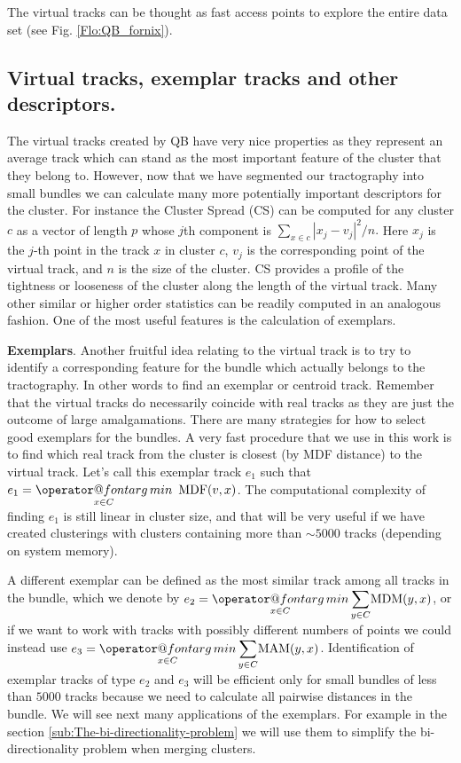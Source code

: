 \documentclass[preprint,authoryear,a4paper,10pt,onecolumn]{elsarticle}
\makeatletter
\def\argmin{\mathop{\operator@font arg\,min}}
\makeatother
\begin{document}
The virtual tracks can be thought as fast access points to explore the
entire data set (see Fig. \ref{Flo:QB_fornix}).


\subsection{Virtual tracks, exemplar tracks and other descriptors.}

The virtual tracks created by QB have very nice properties as they
represent an average track which can stand as the most important feature
of the cluster that they belong to. However, now that we have segmented
our tractography into small bundles we can calculate many more
potentially important descriptors for the cluster. For instance the
Cluster Spread (CS) can be computed for any cluster $c$ as a vector of
length $p$ whose $j$th component is $\sum_{x\in c}|x_{j}-v_{j}|^{2}/n.$
Here $x_{j}$ is the $j$-th point in the track $x$ in cluster $c$,
$v_{j}$ is the corresponding point of the virtual track, and $n$ is the
size of the cluster. CS provides a profile of the tightness or looseness
of the cluster along the length of the virtual track. Many other similar
or higher order statistics can be readily computed in an analogous
fashion. One of the most useful features is the calculation of
exemplars.

\textbf{Exemplars}. Another fruitful idea relating to the virtual track
is to try to identify a corresponding feature for the bundle which
actually belongs to the tractography. In other words to find an exemplar
or centroid track. Remember that the virtual tracks do necessarily
coincide with real tracks as they are just the outcome of large
amalgamations. There are many strategies for how to select good
exemplars for the bundles. A very fast procedure that we use in this
work is to find which real track from the cluster is closest (by MDF
distance) to the virtual track. Let's call this exemplar track $e_{1}$
such that $e_{1}={\displaystyle \argmin_{x\in C}}\textrm{\,\ MDF}(v,x)$.
The computational complexity of finding $e_{1}$ is still linear in
cluster size, and that will be very useful if we have created
clusterings with clusters containing more than $\sim5000$ tracks
(depending on system memory).

A different exemplar can be defined as the most similar track among all
tracks in the bundle, which we denote by $e_{2}={\displaystyle
  \argmin_{x\in C}}\,{\displaystyle \sum_{y\in C}}\mathrm{MDM(}y,x)$, or
if we want to work with tracks with possibly different numbers of points
we could instead use $e_{3}={\displaystyle \argmin_{x\in
    C}}\,{\displaystyle \sum_{y\in C}}\mathrm{MAM(}y,x)$.
Identification of exemplar tracks of type $e_{2}$ and $e_{3}$ will be
efficient only for small bundles of less than $5000$ tracks because we
need to calculate all pairwise distances in the bundle. We will see next
many applications of the exemplars. For example in the section
\ref{sub:The-bi-directionality-problem} we will use them to simplify the
bi-directionality problem when merging clusters.
\end{document}
